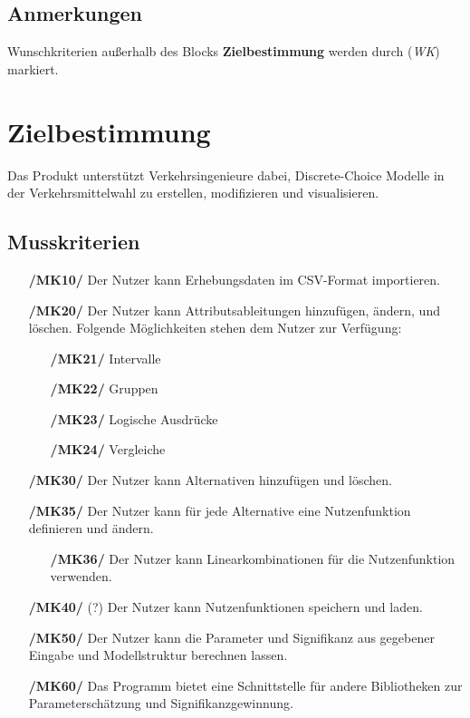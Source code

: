 \documentclass{article}
\begin{document}
\subsection{Anmerkungen}
Wunschkriterien außerhalb des Blocks \textbf{Zielbestimmung} werden durch (\textit{WK}) markiert.

\newpage
\section{Zielbestimmung}
Das Produkt unterstützt Verkehrsingenieure dabei, Discrete-Choice Modelle in der Verkehrsmittelwahl zu erstellen, modifizieren und visualisieren.
\subsection{Musskriterien}
\begin{itemize}
    \item[\textbf{/MK10/}] Der Nutzer kann Erhebungsdaten im CSV-Format importieren.
    \item[\textbf{/MK20/}] Der Nutzer kann Attributsableitungen hinzufügen, ändern, und löschen.
    \subitem Folgende Möglichkeiten stehen dem Nutzer zur Verfügung:
    \begin{itemize}[leftmargin=.7in]
        \item[\textbf{/MK21/}] Intervalle
        \item[\textbf{/MK22/}] Gruppen
        \item[\textbf{/MK23/}] Logische Ausdrücke
        \item[\textbf{/MK24/}] Vergleiche
    \end{itemize}
    \item[\textbf{/MK30/}] Der Nutzer kann Alternativen hinzufügen und löschen.
    \item[\textbf{/MK35/}] Der Nutzer kann für jede Alternative eine Nutzenfunktion definieren und ändern.
    \begin{itemize}[leftmargin=.7in]
        \item[\textbf{/MK36/}] Der Nutzer kann Linearkombinationen für die Nutzenfunktion verwenden.
    \end{itemize}
    \item[\textbf{/MK40/}] (?) Der Nutzer kann Nutzenfunktionen speichern und laden.
    \item[\textbf{/MK50/}] Der Nutzer kann die Parameter und Signifikanz aus gegebener Eingabe und Modellstruktur berechnen lassen.
    \item[\textbf{/MK60/}] Das Programm bietet eine Schnittstelle für andere Bibliotheken zur Parameterschätzung und Signifikanzgewinnung. 

\end{itemize}
\end{document}
